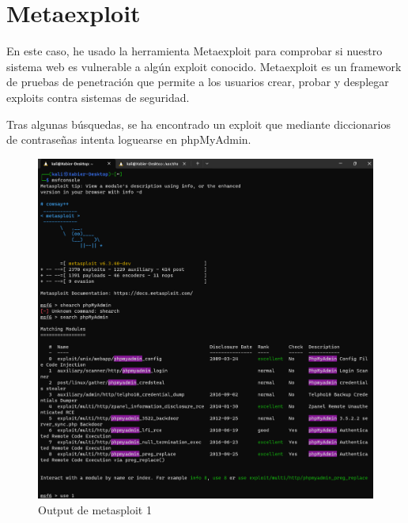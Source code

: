 \documentclass{report}
\begin{document}
        \section{Metaexploit}
            En este caso, he usado la herramienta Metaexploit para comprobar si nuestro sistema web es vulnerable a algún exploit conocido.
            Metaexploit es un framework de pruebas de penetración que permite a los usuarios crear, probar y desplegar exploits contra sistemas de seguridad.
            
            Tras algunas búsquedas, se ha encontrado un exploit que mediante diccionarios de contraseñas intenta loguearse en phpMyAdmin.
            \begin{figure}[H]
                \centering
                \includegraphics[width=\textwidth]{./img/audit1/msf1.png}
                \caption{Output de metasploit 1}
            \end{figure}
\end{document}
